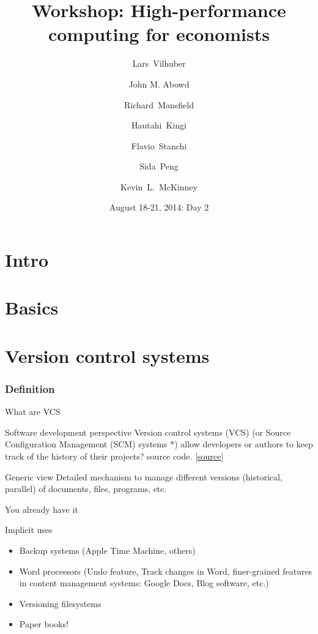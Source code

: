 \documentclass[xcolor=table,compress]{beamer}
\title[Computing for Economists]{Workshop: High-performance computing for economists}
\author[Vilhuber, Abowd, Mansfield, McKinney]{%
  Lars~Vilhuber\inst{1} \and
  John M. Abowd\inst{1} \and
  Richard~Mansfield\inst{1} \and
    Hautahi~Kingi\inst{1} \and
    Flavio~Stanchi\inst{1} \and
    Sida~Peng\inst{1} \and
  Kevin~L.~McKinney %
}
\institute[Cornell]{
  \inst{1}%
   Cornell University, Economics Department,
}%
\date[August 18-21, 2014]{August 18-21, 2014: Day 2}
\begin{document}
\frame{\titlepage}
\section{Intro}
\section{Basics}
\section[VCS]{Version control systems}


\subsubsection{Definition}

\begin{frame}{What are VCS}
\begin{block}{Software development perspective}
Version control systems (VCS) (or Source Configuration Management (SCM) systems $*$) allow developers or authors to keep track of the history of their projects? source code. [\href{http://better-scm.shlomifish.org/}{source}]

\end{block}
\pause
\begin{block}{Generic view}
Detailed mechanism to manage different versions (historical, parallel) of documents, files, programs, etc.
\end{block}
\end{frame}



\begin{frame}{You already have it}
\begin{block}{Implicit uses}
\begin{itemize}
\item Backup systems (Apple Time Machine, others)
\item Word processors (Undo feature, Track changes in Word, finer-grained features in content management systems: Google Docs, Blog software, etc.)
\item Versioning filesystems
\item Paper books!
\end{itemize}
\end{block}
\end{frame}
\end{document}
